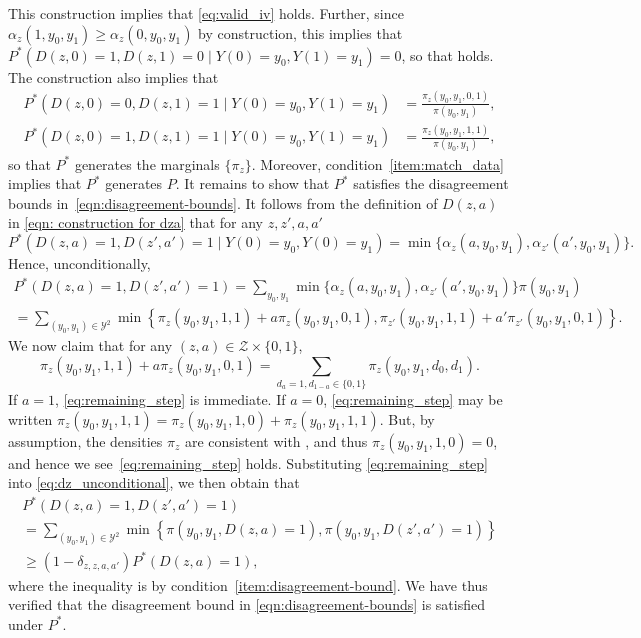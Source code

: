 \documentclass[12pt]{article}%
\theoremstyle{definition}
\newcommand\1{\operatorname{I}\indicatorfence}
\begin{document}
\begin{appendices}
This construction implies that \cref{eq:valid_iv} holds. Further, since $\alpha_z(1,y_0,y_1) \geq \alpha_z(0,y_0,y_1)$ by construction, this implies that $P^*(D(z,0)=1, D(z,1)=0 \mid Y(0)=y_0, Y(1)=y_1)= 0$, so that
 holds. The construction also implies that
\begin{align*}
  P^*(D(z,0)=0, D(z,1)=1 \mid Y(0)=y_0, Y(1)=y_1)& = \frac{\pi_z(y_0,y_1,0,1)}{\pi(y_0,y_1)}, \\
  P^*(D(z,0)=1, D(z,1)=1 \mid Y(0)=y_0, Y(1)=y_1) &= \frac{\pi_z(y_0,y_1,1,1)}{\pi(y_0,y_1)},
\end{align*}
so that $P^{*}$ generates the marginals $\{\pi_{z}\}$. Moreover,
condition~\ref{item:match_data} implies that $P^*$ generates $P$. It remains to
show that $P^{*}$ satisfies the disagreement bounds
in~\eqref{eqn:disagreement-bounds}. It follows from the definition of $D(z, a)$
in \cref{eqn: construction for dza} that for any $z,z',a,a'$
\begin{equation*}
  P^{*}(D(z, a)=1, D(z', a')=1\mid Y(0)=y_{0}, Y(0)=y_{1})=
  \min\{\alpha_{z}(a, y_{0}, y_{1}), \alpha_{z'}(a', y_{0}, y_{1})\}.
\end{equation*}
Hence, unconditionally,
\begin{multline}\label{eq:dz_unconditional}
  P^{*}(D(z, a)=1, D(z', a')=1)=
  \sum_{y_{0}, y_{1}} \min\{\alpha_{z}(a, y_{0}, y_{1}),
  \alpha_{z'}(a', y_{0}, y_{1})\}\pi(y_{0}, y_{1})\\
  =\sum_{(y_0,y_1) \in \mathcal{Y}^2} \min\left\{\pi_z(y_0,y_1,1,1)+a\pi_z(y_0,y_1,0,1), \pi_{z'}(y_0,y_1,1,1)+a'\pi_{z'}(y_0,y_1,0,1) \right \}.
\end{multline}
We now claim that for any $(z, a) \in \mathcal{Z} \times \{0,1\}$,
\begin{equation}\label{eq:remaining_step}
  \pi_z(y_0,y_1,1,1)+a\pi_z(y_0,y_1,0,1) = \sum_{d_a=1, d_{1-a} \in \{0,1\}}
    \pi_z(y_{0}, y_{1}, d_{0}, d_{1}).
\end{equation}
If $a=1$, \cref{eq:remaining_step} is
immediate. If $a=0$, \cref{eq:remaining_step} may be written
$\pi_z(y_0,y_1,1,1)=\pi_z(y_0,y_1,1,0)+\pi_z(y_0, y_1, 1, 1)$. But, by assumption, the densities $\pi_z$ are consistent with , and thus
$\pi_z(y_0,y_1,1,0)=0$, and hence we see~\cref{eq:remaining_step} holds. Substituting \cref{eq:remaining_step} into \cref{eq:dz_unconditional}, we then obtain that
\begin{multline*}
  P^{*}(D(z, a)=1, D(z', a')=1)\\
  =\sum_{(y_0,y_1) \in \mathcal{Y}^2} \min\left\{
    \pi(y_{0}, y_{1},
    D(z, a)=1), \pi(y_{0}, y_{1},
    D(z', a')=1) \right \}\\
  \geq (1-\delta_{z, z, a, a'})P^{*}(D(z, a)=1),
\end{multline*}
where the inequality is by condition~\ref{item:disagreement-bound}. We have thus verified that the disagreement bound in \cref{eqn:disagreement-bounds} is satisfied under $P^*$.


\end{appendices}
\end{document}
